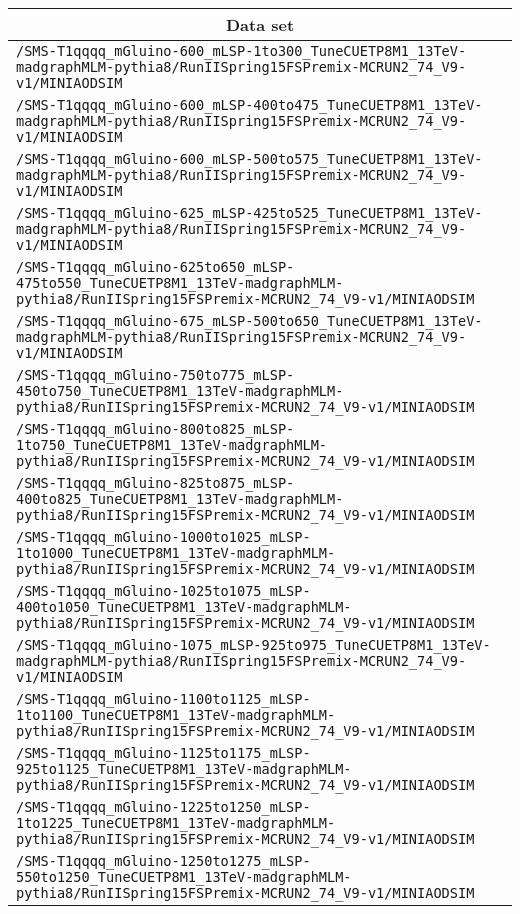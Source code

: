 \begin{center}
\begin{tabular}{l}
\hline\hline
\multicolumn{1}{c}{Data set}\tabularnewline
\hline
\verb!/SMS-T1qqqq_mGluino-600_mLSP-1to300_TuneCUETP8M1_13TeV-madgraphMLM-pythia8/RunIISpring15FSPremix-MCRUN2_74_V9-v1/MINIAODSIM! \tabularnewline
\verb!/SMS-T1qqqq_mGluino-600_mLSP-400to475_TuneCUETP8M1_13TeV-madgraphMLM-pythia8/RunIISpring15FSPremix-MCRUN2_74_V9-v1/MINIAODSIM! \tabularnewline
\verb!/SMS-T1qqqq_mGluino-600_mLSP-500to575_TuneCUETP8M1_13TeV-madgraphMLM-pythia8/RunIISpring15FSPremix-MCRUN2_74_V9-v1/MINIAODSIM! \tabularnewline
\verb!/SMS-T1qqqq_mGluino-625_mLSP-425to525_TuneCUETP8M1_13TeV-madgraphMLM-pythia8/RunIISpring15FSPremix-MCRUN2_74_V9-v1/MINIAODSIM! \tabularnewline
\verb!/SMS-T1qqqq_mGluino-625to650_mLSP-475to550_TuneCUETP8M1_13TeV-madgraphMLM-pythia8/RunIISpring15FSPremix-MCRUN2_74_V9-v1/MINIAODSIM! \tabularnewline
\verb!/SMS-T1qqqq_mGluino-675_mLSP-500to650_TuneCUETP8M1_13TeV-madgraphMLM-pythia8/RunIISpring15FSPremix-MCRUN2_74_V9-v1/MINIAODSIM! \tabularnewline
\verb!/SMS-T1qqqq_mGluino-750to775_mLSP-450to750_TuneCUETP8M1_13TeV-madgraphMLM-pythia8/RunIISpring15FSPremix-MCRUN2_74_V9-v1/MINIAODSIM! \tabularnewline
\verb!/SMS-T1qqqq_mGluino-800to825_mLSP-1to750_TuneCUETP8M1_13TeV-madgraphMLM-pythia8/RunIISpring15FSPremix-MCRUN2_74_V9-v1/MINIAODSIM! \tabularnewline
\verb!/SMS-T1qqqq_mGluino-825to875_mLSP-400to825_TuneCUETP8M1_13TeV-madgraphMLM-pythia8/RunIISpring15FSPremix-MCRUN2_74_V9-v1/MINIAODSIM! \tabularnewline
\verb!/SMS-T1qqqq_mGluino-1000to1025_mLSP-1to1000_TuneCUETP8M1_13TeV-madgraphMLM-pythia8/RunIISpring15FSPremix-MCRUN2_74_V9-v1/MINIAODSIM! \tabularnewline
\verb!/SMS-T1qqqq_mGluino-1025to1075_mLSP-400to1050_TuneCUETP8M1_13TeV-madgraphMLM-pythia8/RunIISpring15FSPremix-MCRUN2_74_V9-v1/MINIAODSIM! \tabularnewline
\verb!/SMS-T1qqqq_mGluino-1075_mLSP-925to975_TuneCUETP8M1_13TeV-madgraphMLM-pythia8/RunIISpring15FSPremix-MCRUN2_74_V9-v1/MINIAODSIM! \tabularnewline
\verb!/SMS-T1qqqq_mGluino-1100to1125_mLSP-1to1100_TuneCUETP8M1_13TeV-madgraphMLM-pythia8/RunIISpring15FSPremix-MCRUN2_74_V9-v1/MINIAODSIM! \tabularnewline
\verb!/SMS-T1qqqq_mGluino-1125to1175_mLSP-925to1125_TuneCUETP8M1_13TeV-madgraphMLM-pythia8/RunIISpring15FSPremix-MCRUN2_74_V9-v1/MINIAODSIM! \tabularnewline
\verb!/SMS-T1qqqq_mGluino-1225to1250_mLSP-1to1225_TuneCUETP8M1_13TeV-madgraphMLM-pythia8/RunIISpring15FSPremix-MCRUN2_74_V9-v1/MINIAODSIM! \tabularnewline
\verb!/SMS-T1qqqq_mGluino-1250to1275_mLSP-550to1250_TuneCUETP8M1_13TeV-madgraphMLM-pythia8/RunIISpring15FSPremix-MCRUN2_74_V9-v1/MINIAODSIM! \tabularnewline

\end{tabular}
\end{center}

